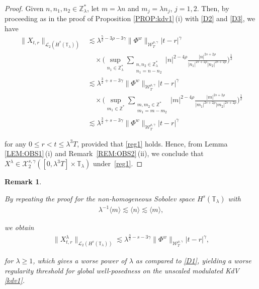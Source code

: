 \documentclass[letterpaper, 11pt,  reqno]{amsart}
\newtheorem{remark}[theorem]{Remark}
\newcommand{\1}{\hspace{0.5mm}\text{I}\hspace{0.5mm}}
\newcommand{\noi}{\noindent}
\newcommand{\Z}{\mathbb{Z}}
\newcommand{\T}{\mathbb{T}}
\newcommand{\g}{\gamma}
\newcommand{\ld}{\lambda}
\newcommand{\les}{\lesssim}
\newcommand{\jb}[1]
{\langle #1 \rangle}
\newcommand{\cL}{\mathcal{L}}
\newcommand{\cX}{\mathcal{X}}
\newcommand{\W}{\mathcal{W}}
\numberwithin{equation}{section}
\numberwithin{theorem}{section}
\begin{document}
\begin{proof}
Given $n, n_1, n_2 \in \Z_\ld^*$, 
let  $m  = \ld n$ and $m_j = \ld n_j$, $j = 1, 2$.
 Then, by 
proceeding as in the proof of Proposition \ref{PROP:kdv1}\,(i)
with 
\eqref{D2}
and  \eqref{D3}, 
 we have 
\begin{align*}
\|X_{t,r} \|_{\cL_2 (\dot H^s(\T_\ld))}
&\les
\ld^{\frac 52-3\rho -3\g}   \| \Phi^w \|_{\W_T^{\rho,\g}} 
  |t-r|^{\g} \\
  & \quad
  \times 
\bigg(\sup_{n_1 \in \Z_\ld^*}
\sum_{\substack{n, n_2 \in \Z_\ld^*\\n_1 = n - n_2}} 
|n|^{2- 4\rho}
 \frac{|n|^{2s+ 2\rho}}{|n_1|^{2s+ 2\rho} |n_2|^{2s + 2\rho}}\bigg)^\frac 12 \\
& \les 
 \ld^{\frac{3}{2}+s-3\g} 
 \| \Phi^w \|_{\W_T^{\rho,\g}} 
  |t-r|^{\g}\\
& \quad \times \bigg( \sup_{m_1 \in \Z^*}
\sum_{\substack{m, m_2 \in \Z^*\\m_1 = m - m_2}} 
|m|^{2- 4\rho}
 \frac{|m|^{2s+ 2\rho}}{|m_1|^{2s+ 2\rho} |m_2|^{2s+ 2\rho}}\bigg)^\frac{1}{2}\\
 &\les
 \ld^{\frac{3}{2}+s-3\g} 
 \| \Phi^w \|_{\W_T^{\rho,\g}} 
  |t-r|^{\g} 
\end{align*}





\noi
for any $0 \le r < t \le \ld^3 T$, 
provided that
\eqref{reg1} holds.
Hence,
from  Lemma \ref{LEM:OBS1}\,(i)
 and Remark~\ref{REM:OBS2}\,(ii), 
we conclude that 
 $X^\ld \in  \cX^{s, \g}_2([0, \ld^3 T]\times \T_\ld)$ under~\eqref{reg1}.
\end{proof}


\begin{remark}\label{REM:scaling1}\rm




By repeating the proof for the non-homogeneous Sobolev space $H^s(\T_\ld)$
with \begin{align*}
\ld^{-1} \jb{m} \les\jb{n} \les \jb{m}, 
\end{align*}

\noi
we obtain
 \begin{align*}
 \| X^{\ld}_{t,r}  \|_{\cL_2 (  H^s(\T_\ld)) }
 \les
 \ld^{ \frac32 -s -3\g} 
  \|\Phi^{w}\|_{\W_{T}^{\rho, \g}}
 |t-r|^{\g}, 
\end{align*}

\noi
for $\ld \ge 1$, 
which gives a worse power of $\ld$ as compared to \eqref{D1},
yielding a worse regularity threshold
for global well-posedness on the  unscaled modulated KdV \eqref{kdv1}.


\end{remark}
\end{document}
